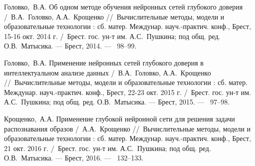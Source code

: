 Головко,~В.А. Об одном методе обучения нейронных сетей глубокого доверия /~В.А.~Головко, А.А.~Крощенко
\newblock //~Вычислительные методы, модели и образовательные технологии : сб. матер. Междунар. науч.-практич. конф., Брест, 15-16 окт. 2014 г.
\newblock /~Брест. гос. ун-т им. А.С.~Пушкина; под общ. ред. О.В.~Матысика. ---
\newblock Брест, 2014. ---
~98--99.

Головко,~В.А. Применение нейронных сетей глубокого доверия в интеллектуальном анализе данных /~В.А.~Головко, А.А.~Крощенко
\newblock //~Вычислительные методы, модели и образовательные технологии : сб. матер. Междунар. науч.-практич. конф., Брест, 22-23 окт. 2015 г.
\newblock /~Брест. гос. ун-т им. А.С.~Пушкина; под общ. ред. О.В.~Матысика. ---
\newblock Брест, 2015. ---
~97--98.

Крощенко,~А.А. Применение глубокой нейронной сети для решения задачи распознавания образов /~А.А.~Крощенко
\newblock //~Вычислительные методы, модели и образовательные технологии : сб. матер. Междунар. науч.-практич. конф., Брест, 21 окт. 2016 г.
\newblock /~Брест. гос. ун-т им. А.С.~Пушкина; под общ. ред. О.В.~Матысика. ---
\newblock Брест, 2016. ---
~132--133.




